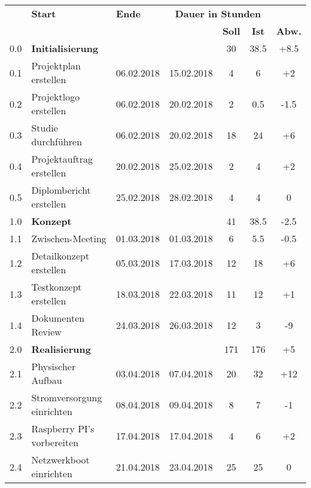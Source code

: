 \begin{table}[H]
\begin{tabular}{|p{0.7cm}p{6.8cm}p{2cm}p{2cm}|c|c|c|}
\hline
\rowcolor{heading}\multicolumn{2}{l}{\textbf{Aufgabe}} & \textbf{Start} & \textbf{Ende} & \multicolumn{3}{c|}{\textbf{Dauer in Stunden}} \\\cline{5-7} 
\rowcolor{heading}& & & & \textbf{Soll} & \textbf{Ist} & \textbf{Abw.} \\\hline
\rowcolor{subheading} 0.0 & \textbf{Initialisierung} & & & 30 & 38.5 & +8.5\\\hline
0.1 & Projektplan erstellen & 06.02.2018 & 15.02.2018  & 4 & 6 & +2 \\\hline
0.2 & Projektlogo erstellen & 06.02.2018 & 20.02.2018 & 2 & 0.5 & -1.5\\\hline
0.3 & Studie durchführen   & 06.02.2018 & 20.02.2018 & 18 & 24 & +6\\\hline
0.4 & Projektauftrag erstellen & 20.02.2018 & 25.02.2018 & 2 & 4 & +2\\\hline
0.5 & Diplombericht erstellen  & 25.02.2018 & 28.02.2018 & 4 & 4 & 0\\\hline
\rowcolor{subheading} 1.0 &\textbf{Konzept} & & & 41 & 38.5 & -2.5 \\\hline
1.1 & Zwischen-Meeting & 01.03.2018 & 01.03.2018 & 6 & 5.5 & -0.5\\\hline
1.2 & Detailkonzept erstellen & 05.03.2018 & 17.03.2018 & 12 & 18 & +6\\\hline
1.3 & Testkonzept erstellen & 18.03.2018 & 22.03.2018 & 11 & 12 & +1\\\hline
1.4 & Dokumenten Review & 24.03.2018 & 26.03.2018  & 12 & 3 & -9 \\\hline
\hline
\rowcolor{subheading} 2.0 & \textbf{Realisierung} & & & 171 & 176 & +5\\\hline
2.1 & Physischer Aufbau & 03.04.2018 & 07.04.2018 & 20 & 32 & +12 \\\hline
2.2 & Stromversorgung einrichten & 08.04.2018 & 09.04.2018 & 8 & 7 & -1 \\\hline
2.3 & Raspberry PI's vorbereiten & 17.04.2018 & 17.04.2018 & 4 & 6 & +2 \\\hline
2.4 & Netzwerkboot einrichten & 21.04.2018 & 23.04.2018 & 25 & 25 & 0 \\\hline

\end{tabular}
\end{table}
